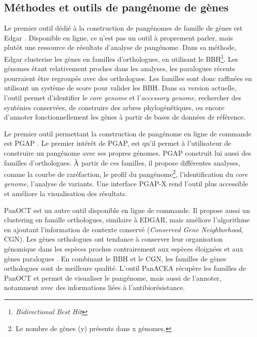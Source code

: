 \subsection{Méthodes et outils de pangénome de gènes}

Le premier outil dédié à la construction de pangénomes de famille de gènes est Edgar \cite{blom_edgar_2009}. Disponible en ligne, ce n'est pas un outil à proprement parler, mais plutôt une ressource de résultats d'analyse de pangénome. Dans sa méthode, Edgar clusterise les gènes en familles d'orthologues, en utilisant le BBH\footnote{\textit{Bidirectional Best Hit}}. Les génomes étant relativement proches dans les analyses, les paralogues récents pourraient être regroupés avec des orthologues. Les familles sont donc raffinées en utilisant un système de score pour valider les BBH. Dans sa version actuelle, l'outil permet d'identifier le \textit{core genome} et l'\textit{accessory genome}, rechercher des synténies conservées, de construire des arbres phylogénétiques, ou encore d'annoter fonctionnellement les gènes à partir de bases de données de référence.

Le premier outil permettant la construction de pangénome en ligne de commande est PGAP \cite{zhao_pgap_2012}. Le premier intérêt de PGAP, est qu'il permet à l'utilisateur de construire un pangénome avec ses propres génomes. PGAP construit lui aussi des familles d'orthologues. À partir de ces familles, il propose différentes analyses, comme la courbe de raréfaction, le profil du pangénome\footnote{Le nombre de gènes (y) présents dans x génomes.}, l'identification du \textit{core genome}, l'analyse de variants. Une interface PGAP-X \cite{zhao_pgap-x_2018} rend l'outil plus accessible et améliore la visualisation des résultats.

PanOCT \cite{fouts_panoct_2012} est un autre outil disponible en ligne de commande. Il propose aussi un clustering en famille orthologues, similaire à EDGAR, mais améliore l'algorithme en ajoutant l'information de contexte conservé (\textit{Conserved Gene Neighborhood}, CGN). Les gènes orthologues ont tendance à conserver leur organisation génomique dans les espèces proches contrairement aux espèces éloignées et aux gènes paralogues \cite{huynen_measuring_1998,rocha_organization_2008}. En combinant le BBH et le CGN, les familles de gènes orthologues sont de meilleure qualité. L'outil PanACEA \cite{clarke_panacea_2018} récupère les familles de PanOCT et permet de visualiser le pangénome, mais aussi de l'annoter, notamment avec des informations liées à l'antibiorésistance. 

